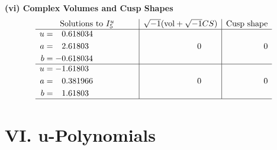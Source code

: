\documentclass[1p]{elsarticle_modified}
\theoremstyle{definition}
\newcommand{\I}{\sqrt{-1}}
\begin{document}
\newpage\flushleft \textbf{(vi) Complex Volumes and Cusp Shapes}
$$\begin{array}{c|c|c}  
\text{Solutions to }I^u_{5}& \I (\text{vol} + \sqrt{-1}CS) & \text{Cusp shape}\\
 \hline 
\begin{aligned}
u &= \phantom{-}0.618034\phantom{ +0.000000I} \\
a &= \phantom{-}2.61803\phantom{ +0.000000I} \\
b &= -0.618034\phantom{ +0.000000I}\end{aligned}
 & \phantom{-0.000000 } 0 & \phantom{-0.000000 } 0 \\ \hline\begin{aligned}
u &= -1.61803\phantom{ +0.000000I} \\
a &= \phantom{-}0.381966\phantom{ +0.000000I} \\
b &= \phantom{-}1.61803\phantom{ +0.000000I}\end{aligned}
 & \phantom{-0.000000 } 0 & \phantom{-0.000000 } 0\\
 \hline 
 \end{array}$$\newpage
\newpage\renewcommand{\arraystretch}{1}
\centering \section*{ VI. u-Polynomials}
\end{document}
